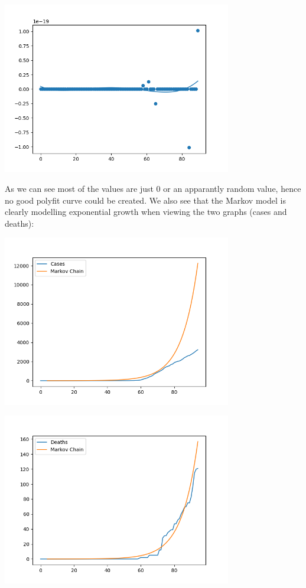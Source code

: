 \documentclass{report}
\begin{document}
                \begin{center}
                    \includegraphics[width=10cm]{plots/markov/s_i.png}
                \end{center}
                As we can see most of the values are just 0 or an apparantly random value, hence no good polyfit curve could be created. We also see that the Markov model is clearly modelling exponential growth when viewing the two graphs (cases and deaths):
                \begin{center}
                    \includegraphics[width=10cm]{plots/markov/cases.png}
                \end{center}
                \begin{center}
                    \includegraphics[width=10cm]{plots/markov/deaths.png}
                \end{center}
\end{document}
